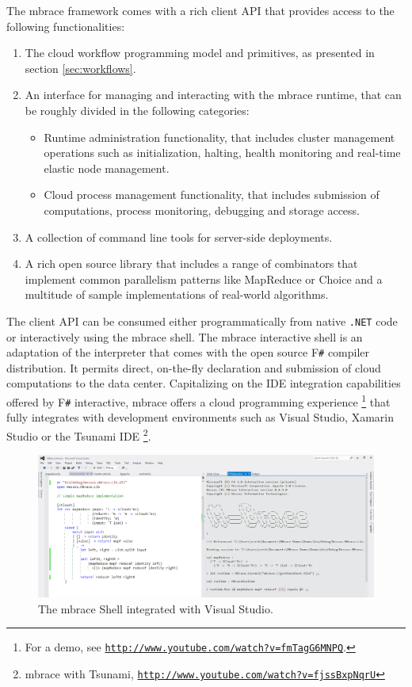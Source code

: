 \documentclass[9pt,a4paper]{article}
\newcommand{\mbrace}{mbrace}
\newcommand{\Mbrace}{\mbrace}
\newcommand{\fsharp}{F\texttt \#}
\newcommand{\dotnet}{\texttt{\hbox{.}NET}}
\newcommand{\samehref}[1]{\href{#1}{\texttt{#1}}}
\begin{document}
The \mbrace{} framework comes with a rich client API that provides access to the 
following functionalities:
\begin{enumerate}
\item The cloud workflow programming model and primitives, as presented in section
\ref{sec:workflows}.
\item An interface for managing and interacting with the \mbrace{} runtime, 
that can be roughly divided in the following categories:
    \begin{itemize}
        \item Runtime administration functionality, that includes cluster management
        operations such as initialization, halting, health monitoring and
        real-time elastic node management.
        \item Cloud process management functionality, that includes submission of
        computations, process monitoring, debugging and storage access.
    \end{itemize}

\item A collection of command line tools for server-side deployments.
\item A rich open source library that includes a range of combinators that
implement common parallelism patterns like MapReduce or Choice and a multitude of 
sample implementations of real-world algorithms.
\end{enumerate}
%
The client API can be consumed either programmatically from native \dotnet{} code
or interactively using the \mbox{\mbrace{}} shell. The \mbrace{} interactive shell is
an adaptation of the interpreter that comes with the open source \fsharp{} compiler
distribution. It permits direct, on-the-fly declaration and submission of cloud 
computations to the data center. Capitalizing on the IDE integration capabilities 
offered by \fsharp{} interactive, \mbrace{} offers a cloud programming experience%
\footnote{For a demo, see \samehref{http://www.youtube.com/watch?v=fmTagG6MNPQ}.}
that fully integrates with development environments such as Visual Studio,
Xamarin Studio or the Tsunami IDE%
\footnote{\mbrace{} with Tsunami, \samehref{http://www.youtube.com/watch?v=fjssBxpNqrU}}.

\begin{figure}[ht]
\label{shellfig}
\centering
\includegraphics[width=\textwidth]{shell.png}
\caption{The \Mbrace{} Shell integrated with Visual Studio.}
\end{figure}
\end{document}
